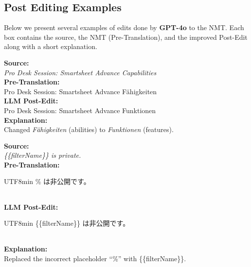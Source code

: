 \documentclass[11pt]{article}
\theoremstyle{plain}
\theoremstyle{definition}
\theoremstyle{remark}
\begin{document}
\subsection{Post Editing Examples}
\label{sec:pe_examples}
Below we present several examples of edits done by \textbf{GPT-4o} to the NMT. Each box contains the source, the NMT (Pre-Translation), and the improved Post-Edit along with a short explanation.

\begingroup
\footnotesize
\begin{tcbraster}[raster columns=2, raster equal height=rows,
                  raster column skip=3mm, raster row skip=3mm]
\begin{tcolorbox}[nobeforeafter, title=German (de-DE),
    boxsep=2pt,
    arc=2pt,
    left=3pt,
    right=3pt,
    colback=gray!5,
    colframe=gray!75!black]
\textbf{Source:}\\
\emph{Pro Desk Session: Smartsheet Advance Capabilities}\\[3pt]
\textbf{Pre-Translation:}\\
Pro Desk Session: Smartsheet Advance Fähigkeiten\\[3pt]
\textbf{LLM Post-Edit:}\\
Pro Desk Session: Smartsheet Advance Funktionen\\[3pt]
\textbf{Explanation:}\\
Changed \emph{Fähigkeiten} (abilities) to \emph{Funktionen} (features).
\end{tcolorbox}
\begin{tcolorbox}[nobeforeafter,  title=Japanese (ja-JP),
    boxsep=2pt,
    arc=2pt,
    left=3pt,
    right=3pt,
    colback=gray!5,
    colframe=gray!75!black]
\textbf{Source:}\\
\emph{\{\{filterName\}\} is private.}\\[3pt]
\textbf{Pre-Translation:}\\
\begin{CJK}{UTF8}{min}
  \% は非公開です。
\end{CJK}\\[3pt]
\textbf{LLM Post-Edit:}\\
\begin{CJK}{UTF8}{min}
  \{\{filterName\}\} は非公開です。
\end{CJK}\\[3pt]
\textbf{Explanation:}\\
Replaced the incorrect placeholder ``\%'' with \{\{filterName\}\}.
\end{tcolorbox}
\begin{tcolorbox}[nobeforeafter, title=Portuguese (pt-BR),
    boxsep=2pt,
    arc=2pt,
    left=3pt,
    right=3pt,
    colback=gray!5,
    colframe=gray!75!black]

\end{tcolorbox}
\end{tcbraster}
\end{document}

